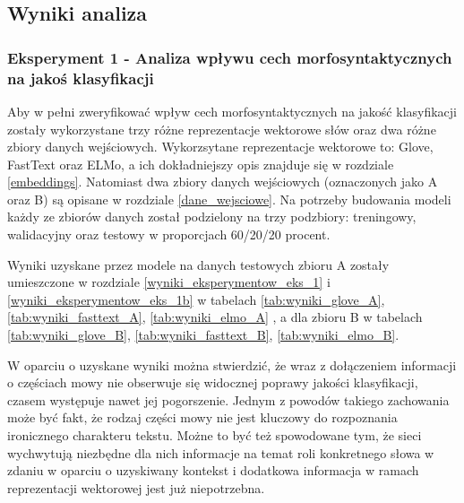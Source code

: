 

\subsection{Wyniki analiza}

\subsubsection{Eksperyment 1 - Analiza wpływu cech morfosyntaktycznych na jakoś klasyfikacji}

Aby w pełni zweryfikować wpływ cech morfosyntaktycznych na jakość klasyfikacji zostały wykorzystane trzy różne reprezentacje wektorowe słów oraz dwa różne zbiory danych wejściowych. Wykorzsytane reprezentacje wektorowe to: Glove, FastText oraz ELMo, a ich dokładniejszy opis znajduje się w rozdziale \ref{embeddings}. Natomiast dwa zbiory danych wejściowych (oznaczonych jako A oraz B) są opisane w rozdziale \ref{dane_wejsciowe}. Na potrzeby budowania modeli każdy ze zbiorów danych został podzielony na trzy podzbiory: treningowy, walidacyjny oraz testowy w proporcjach 60/20/20 procent.

Wyniki uzyskane przez modele na danych testowych zbioru A zostały umieszczone w rozdziale \ref{wyniki_eksperymentow_eks_1} i \ref{wyniki_eksperymentow_eks_1b} w tabelach \ref{tab:wyniki_glove_A}, \ref{tab:wyniki_fasttext_A}, \ref{tab:wyniki_elmo_A} , a dla zbioru B w tabelach \ref{tab:wyniki_glove_B}, \ref{tab:wyniki_fasttext_B}, \ref{tab:wyniki_elmo_B}.


W oparciu o uzyskane wyniki można stwierdzić, że wraz z dołączeniem informacji o częściach mowy nie obserwuje się widocznej poprawy jakości klasyfikacji, czasem występuje nawet jej pogorszenie. Jednym z powodów takiego zachowania może być fakt, że rodzaj części mowy nie jest kluczowy do rozpoznania ironicznego charakteru tekstu. Możne to być też spowodowane tym, że sieci wychwytują niezbędne dla nich informacje na temat roli konkretnego słowa w zdaniu w oparciu o uzyskiwany kontekst i dodatkowa informacja w ramach reprezentacji wektorowej jest już niepotrzebna.

